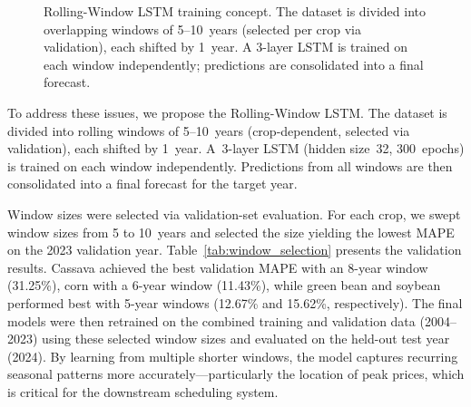 \documentclass[conference]{IEEEtran}
\begin{document}
\begin{figure}[htbp]
{}%
  \caption{Rolling-Window LSTM training concept. The dataset is divided into overlapping windows of 5--10~years (selected per crop via validation), each shifted by 1~year. A 3-layer LSTM is trained on each window independently; predictions are consolidated into a final forecast.}
  \label{fig:rolling}
\end{figure}

To address these issues, we propose the Rolling-Window LSTM. The dataset is divided into rolling windows of 5--10~years (crop-dependent, selected via validation), each shifted by 1~year. A~3-layer LSTM (hidden size~32, 300~epochs) is trained on each window independently. Predictions from all windows are then consolidated into a final forecast for the target year.

Window sizes were selected via validation-set evaluation. For each crop, we swept window sizes from 5 to 10~years and selected the size yielding the lowest MAPE on the 2023 validation year. Table~\ref{tab:window_selection} presents the validation results. Cassava achieved the best validation MAPE with an 8-year window (31.25\%), corn with a 6-year window (11.43\%), while green bean and soybean performed best with 5-year windows (12.67\% and 15.62\%, respectively). The final models were then retrained on the combined training and validation data (2004--2023) using these selected window sizes and evaluated on the held-out test year (2024). By learning from multiple shorter windows, the model captures recurring seasonal patterns more accurately---particularly the location of peak prices, which is critical for the downstream scheduling system.
\end{document}
